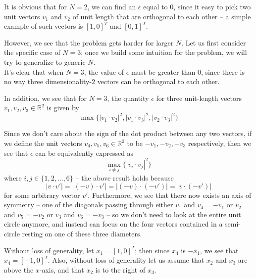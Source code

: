 \documentclass[11pt,letterpaper,twoside,english]{article}
\theoremstyle{theorem}
\theoremstyle{remark}
\begin{document}
It is obvious that for $N=2$, we can find an $\epsilon$ equal to $0$, since it easy to pick two unit vectors $v_1$ and $v_2$ of unit length that are orthogonal to each other -- a simple example of such vectors is $[1, 0]^T$ and $[0, 1]^T$. 

However, we see that the problem gets harder for larger $N$. Let us first consider the specific case of $N=3$; once we build some intuition for the problem, we will try to generalize to generic $N$.
\\

It's clear that when $N=3$, the value of $\epsilon$ must be greater than $0$, since there is no way three dimensionality-$2$ vectors can be orthogonal to each other.

In addition, we see that for $N=3$, the quantity $\epsilon$ for three unit-length vectors $v_1, v_2, v_3 \in \mathbb{R}^2$ is given by $$\max \{ |v_1 \cdot v_2|^2, |v_1 \cdot v_3|^2, |v_2 \cdot v_3|^2 \}$$

Since we don't care about the sign of the dot product between any two vectors, if we define the unit vectors $v_4, v_5, v_6 \in \mathbb{R}^2$ to be $-v_1, -v_2, -v_3$ respectively, then we see that $\epsilon$ can be equivalently expressed as $$\max_{i \neq j} \{|v_i \cdot v_j |^2 \}$$
where $i, j \in \{1,2,\ldots,6\}$ -- the above result holds because $$|v \cdot v'| = |(-v) \cdot v'| = |(-v) \cdot (-v')| = |v \cdot (-v')|$$ for some arbitrary vector $v'$. Furthermore, we see that there now exists an axis of symmetry -- one of the diagonals passing through either $v_1$ and $v_4 = -v_1$ or $v_2$ and $v_5 = -v_2$ or $v_3$ and $v_6 = -v_3$ -- so we don't need to look at the entire unit circle anymore, and instead can focus on the four vectors contained in a semi-circle resting on one of these three diameters.

Without loss of generality, let $x_1 = [1, 0]^T$; then since $x_4$ is $-x_1$, we see that $x_4 = [-1, 0]^T$. Also, without loss of generality let us assume that $x_2$ and $x_3$ are above the $x$-axis, and that $x_2$ is to the right of $x_3$.
\end{document}
